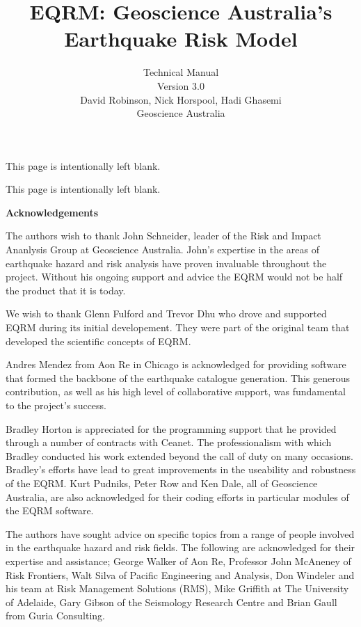 \documentclass[a4paper, 12pt]{report}
\title{EQRM: Geoscience Australia's Earthquake Risk Model\\
}
\author{Technical Manual \\[1em]
Version 3.0 \\[3em]
David Robinson, Nick Horspool, Hadi Ghasemi\\[1em]
Geoscience Australia}
\begin{document}
\maketitle


This page is intentionally left blank. \newpage


This page is intentionally left blank.
\newpage

 {\Huge \textbf{Acknowledgements}  }

The authors wish to thank John Schneider, leader of the Risk
and Impact Ananlysis Group at Geoscience Australia. John's expertise in the
areas of earthquake hazard and risk analysis have proven
invaluable throughout the project. Without his ongoing support and
advice the EQRM would not be half the product that it is today.

We wish to thank Glenn Fulford and Trevor Dhu who drove and supported EQRM
during its initial developement.  They were part of the original team
that developed the scientific concepts of EQRM.

Andres Mendez from Aon Re in Chicago is acknowledged for providing
software that formed the backbone of the earthquake catalogue
generation. This generous contribution, as well as his high level of
collaborative support, was fundamental to the project's success.

Bradley Horton is appreciated for the programming support that he
provided through a number of contracts with Ceanet. The
professionalism with which Bradley conducted his work extended
beyond the call of duty on many occasions. Bradley's efforts have
lead to great improvements in the useability and robustness of the
EQRM. Kurt Pudniks, Peter Row and Ken Dale, all of Geoscience
Australia, are also acknowledged for their coding efforts in
particular modules of the EQRM software.

The authors have sought advice on specific topics from a range of
people involved in the earthquake hazard and risk fields. The
following are acknowledged for their expertise and assistance;
George Walker of Aon Re, Professor John McAneney of Risk
Frontiers, Walt Silva of Pacific Engineering and Analysis, Don
Windeler and his team at Risk Management Solutions (RMS), Mike
Griffith at The University of Adelaide, Gary Gibson of the
Seismology Research Centre and Brian Gaull from Guria Consulting.
\end{document}
